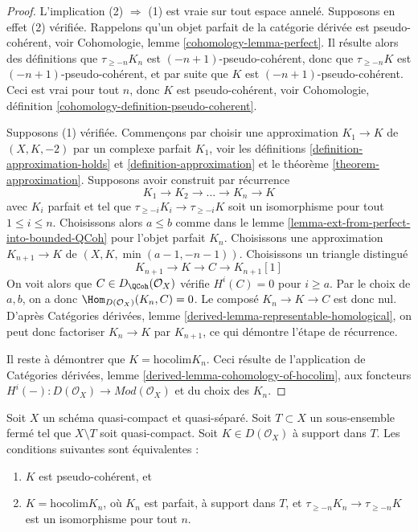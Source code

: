 \begin{proof}
L'implication (2) $\Rightarrow$ (1) est vraie sur tout espace annelé.
Supposons en effet (2) vérifiée. Rappelons qu'un objet parfait de la catégorie
dérivée est pseudo-cohérent, voir
Cohomologie, lemme \ref{cohomology-lemma-perfect}.
Il résulte alors des définitions que
$\tau_{\geq -n}K_n$ est $(-n + 1)$-pseudo-cohérent,
donc que $\tau_{\geq -n}K$ est $(-n + 1)$-pseudo-cohérent,
et par suite que $K$ est $(-n + 1)$-pseudo-cohérent. Ceci est vrai pour
tout $n$, donc $K$ est pseudo-cohérent, voir
Cohomologie, définition \ref{cohomology-definition-pseudo-coherent}.

\medskip\noindent
Supposons (1) vérifiée. Commençons par choisir une approximation
$K_1 \to K$ de $(X, K, -2)$ par un complexe parfait $K_1$, voir les
définitions \ref{definition-approximation-holds} et
\ref{definition-approximation} et le
théorème \ref{theorem-approximation}.
Supposons avoir construit par récurrence
$$
K_1 \to K_2 \to \ldots \to K_n \to K
$$
avec $K_i$ parfait et tel que
$\tau_{\geq -i}K_i \to \tau_{\geq -i}K$ soit un isomorphisme
pour tout $1 \leq i \leq n$. Choisissons alors $a \leq b$ comme dans le
lemme \ref{lemma-ext-from-perfect-into-bounded-QCoh}
pour l'objet parfait $K_n$. Choisissons une approximation
$K_{n + 1} \to K$ de $(X, K, \min(a - 1, -n - 1))$.
Choisissons un triangle distingué
$$
K_{n + 1} \to K \to C \to K_{n + 1}[1]
$$
On voit alors que $C \in D_\QCoh(\mathcal{O}_X)$ vérifie
$H^i(C) = 0$ pour $i \geq a$. Par le choix de $a, b$,
on a donc $\Hom_{D(\mathcal{O}_X)}(K_n, C) = 0$.
Le composé $K_n \to K \to C$ est donc nul. D'après
Catégories dérivées, lemme \ref{derived-lemma-representable-homological},
on peut donc factoriser $K_n \to K$ par $K_{n + 1}$,
ce qui démontre l'étape de récurrence.

\medskip\noindent
Il reste à démontrer que $K = \text{hocolim} K_n$.
Ceci résulte de l'application de
Catégories dérivées, lemme \ref{derived-lemma-cohomology-of-hocolim},
aux foncteurs
$H^i( - ) : D(\mathcal{O}_X) \to \textit{Mod}(\mathcal{O}_X)$
et du choix des $K_n$.
\end{proof}

\begin{lemma}
\label{lemma-pseudo-coherent-hocolim-with-support}
Soit $X$ un schéma quasi-compact et quasi-séparé.
Soit $T \subset X$ un sous-ensemble fermé tel que $X \setminus T$
soit quasi-compact. Soit $K \in D(\mathcal{O}_X)$ à support dans $T$.
Les conditions suivantes sont équivalentes :
\begin{enumerate}
\item $K$ est pseudo-cohérent, et
\item $K = \text{hocolim} K_n$, où
$K_n$ est parfait, à support dans $T$, et
$\tau_{\geq -n}K_n \to \tau_{\geq -n}K$ est un isomorphisme pour tout $n$.
\end{enumerate}
\end{lemma}

